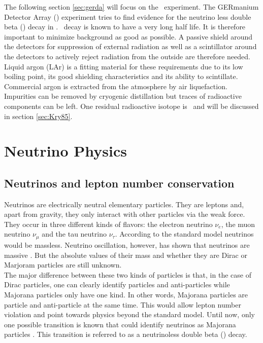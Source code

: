 \documentclass[encoding=utf8,british]{tumphthesis}
\begin{document}
The following section \ref{sec:gerda} will focus on the \gerda\ experiment.
The GERmanium Detector Array (\gerda) experiment tries to find evidence for the neutrino less double beta (\onbb) decay in  \cite{agostini_background_2017}.
\onbb\ decay is known to have a very long half life.
It is therefore important to minimize background as good as possible. 
A passive shield around the detectors for suppression of external radiation as well as a scintillator around the detectors to actively reject radiation from the outside are therefore needed.
Liquid argon (LAr) is a fitting material for these requirements due to its low boiling point, its good shielding characteristics and its ability to scintillate. 
Commercial argon is extracted from the atmosphere by air liquefaction. 
Impurities can be removed by cryogenic distillation but traces of radioactive components can be left.
One residual radioactive isotope is \Kr\ and  will be discussed in section \ref{sec:Kry85}. 
\\


\section{Neutrino Physics}
\label{sec:PhyBG}

\subsection{Neutrinos and lepton number conservation}

Neutrinos are electrically neutral elementary particles.
They are leptons and, apart from gravity, they only interact with other particles via the weak force.
They occur in three different kinds of flavors: the electron neutrino $\nu_e$, the muon neutrino $\nu_{\mu}$ and the tau neutrino $\nu_{\tau}$.
According to the standard model neutrinos would be massless.
Neutrino oscillation, however, has shown that neutrinos are massive \cite{fukuda_evidence_1998,sno_collaboration_direct_2002}.
But the absolute values of their mass and whether they are Dirac or Marjoram particles are still unknown. 
\\

The major difference between these two kinds of particles is that, in the case of Dirac particles, one can clearly identify particles and anti-particles while Majorana particles only have one kind.
In other words, Majorana particles are particle and anti-particle at the same time.
This would allow lepton number violation and point towards physics beyond the standard model.
Until now, only one possible transition is known that could identify neutrinos as Majorana particles \cite{schechter_neutrinoless_1982}.
This transition is referred to as a neutrinoless double beta (\onbb) decay. 
 
\end{document}
